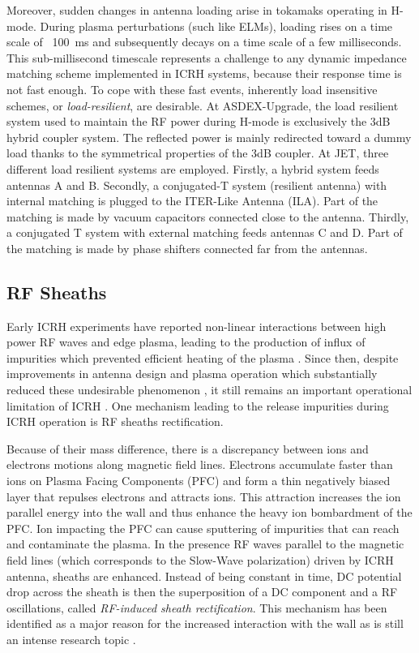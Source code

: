 Moreover, sudden changes in antenna loading arise in tokamaks operating in H-mode. During plasma perturbations (such like ELMs), loading rises on a time scale of ~100~ms and subsequently decays on a time scale of a few milliseconds. This sub-millisecond timescale represents a challenge to any dynamic impedance matching scheme implemented in ICRH systems, because their response time is not fast enough. To cope with these fast events, inherently load insensitive schemes, or \textit{load-resilient}, are desirable. At ASDEX-Upgrade, the load resilient system used to maintain the RF power during H-mode is exclusively the 3dB hybrid coupler system. The reflected power is mainly redirected toward a dummy load thanks to the symmetrical properties of the 3dB coupler. At JET, three different load resilient systems are employed. Firstly, a hybrid system feeds antennas A and B. Secondly, a conjugated-T system (resilient antenna) with internal matching is plugged to the ITER-Like Antenna (ILA). Part of the matching is made by vacuum capacitors connected close to the antenna. Thirdly, a conjugated T system with external matching feeds antennas C and D. Part of the matching is made by phase shifters connected far from the antennas.


\subsection{RF Sheaths}\label{sec:RF_sheaths}
Early ICRH experiments have reported non-linear interactions between high power RF waves and edge plasma, leading to the production of influx of impurities which prevented efficient heating of the plasma . Since then, despite improvements in antenna design and plasma operation which substantially reduced these undesirable phenomenon , it still remains an important operational limitation of ICRH . One mechanism leading to the release impurities during ICRH operation is RF sheaths rectification. 

Because of their mass difference, there is a discrepancy between ions and electrons motions along magnetic field lines. Electrons accumulate faster than ions on Plasma Facing Components (PFC) and form a thin negatively biased layer that repulses electrons and attracts ions. This attraction increases the ion parallel energy into the wall and thus enhance the heavy ion bombardment of the PFC. Ion impacting the PFC can cause sputtering of impurities that can reach and contaminate the plasma. In the presence RF waves parallel to the magnetic field lines (which corresponds to the Slow-Wave polarization) driven by ICRH antenna, sheaths are enhanced. Instead of being constant in time, DC potential drop across the sheath is then the superposition of a DC component and a RF oscillations, called \textit{RF-induced sheath rectification}. This  mechanism has been identified as a major reason for the increased interaction with the wall as is still an intense research topic .



